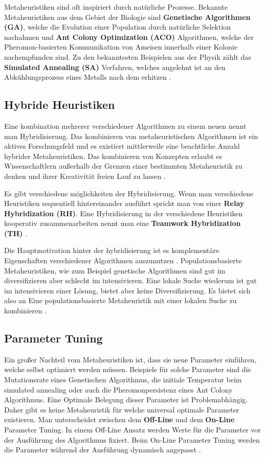 Metaheuristiken sind oft inspiriert durch natürliche Prozesse. Bekannte Metaheuristiken aus dem Gebiet der Biologie sind \textbf{Genetische Algorithmen (GA)}, welche die Evolution einer Population durch natürliche Selektion nachahmen und \textbf{Ant Colony Optimization (ACO)} Algorithmen, welche der Pheromon-basierten Kommunikation von Ameisen innerhalb einer Kolonie nachempfunden sind. Zu den bekanntesten Beispielen aus der Physik zählt das \textbf{Simulated Annealing (SA)} Verfahren, welches angelehnt ist an den Abkühlungsprozess eines Metalls nach dem erhitzen \cite*{metaheuristics}.

\subsection{Hybride Heuristiken}
Eine kombination mehrerer verschiedener Algorithmen zu einem neuen nennt man Hybridisierung. Das kombinieren von metaheuristischen Algorithmen ist ein aktives Forschungsfeld und es existiert mittlerweile eine beachtliche Anzahl hybrider Metaheuristiken. Das kombinieren von Konzepten erlaubt es Wissenschaftlern außerhalb der Grenzen einer bestimmten Metaheuristik zu denken und ihrer Kreativität freien Lauf zu lassen \cite*{MetaheuristicsSurvey}.

Es gibt verschiedene möglichkeiten der Hybridisierung. Wenn man verschiedene Heuristiken sequentiell hintereinander ausführt spricht man von einer \textbf{Relay Hybridization (RH)}. Eine Hybridisierung in der verschiedene Heuristiken kooperativ zusammenarbeiten nennt man eine \textbf{Teamwork Hybridization (TH)} \cite*{MetaheuristicsEGT}. 

Die Hauptmotivation hinter der hybridisierung ist es komplementäre Eigenschaften verschiedener Algorithmen auszunutzen \cite*{MetaheuristicsSurvey}. Populationsbasierte Metaheuristiken, wie zum Beispiel genetische Algorithmen sind gut im diversifizieren aber schlecht im intensivieren. Eine lokale Suche wiederum ist gut im intensivieren einer Lösung, bietet aber keine Diversifizierung. Es bietet sich also an Eine populationsbasierte Metaheuristik mit einer lokalen Suche zu kombinieren \cite*{MetaheuristicsEGT}.

\subsection{Parameter Tuning}
Ein großer Nachteil vom Metaheuristiken ist, dass sie neue Parameter einführen, welche selbst optimiert werden müssen. Beispiele für solche Parameter sind die Mutationsrate eines Genetischen Algorithmus, die initiale Temperatur beim simulated annealing oder auch die Pheromonpersistenz eines Ant Colony Algorithmus. Eine Optimale Belegung dieser Parameter ist Problemabhängig. Daher gibt es keine Metaheuristik für welche universal optimale Parameter existieren. Man unterscheidet zwischen dem \textbf{Off-Line} und dem \textbf{On-Line} Parameter Tuning. In einem Off-Line Ansatz werden Werte für die Parameter vor der Ausführung des Algorithmus fixiert. Beim On-Line Parameter Tuning werden die Parameter während der Ausführung dynamisch angepasst \cite*{MetaheuristicsEGT}.

